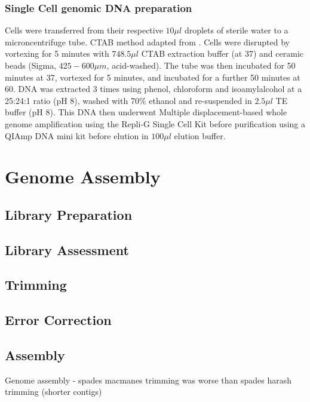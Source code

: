 \subsubsection{Single Cell genomic DNA preparation}
Cells were transferred from their respective \(10\mu l\) droplets of sterile water to a microncentrifuge tube.
CTAB method adapted from \citep{Winnepenninckx1993}.  Cells were disrupted by vortexing for 5 minutes with
\(748.5\mu l\) CTAB extraction buffer (at 37\celsius) and ceramic beads (Sigma, \(425-600\mu m\), acid-washed).
The tube was then incubated for 50 minutes at 37\celsius, vortexed for 5 minutes, and incubated for a further 50
minutes at 60\celsius. DNA was extracted 3 times using phenol, chloroform and isoamylalcohol at a 25:24:1 ratio (pH 8),
washed with 70\% ethanol and re-suspended in \(2.5\mu l\) TE buffer (pH 8). This DNA then underwent 
Multiple displacement-based whole genome amplification using the Repli-G Single Cell Kit before purification using a 
QIAmp DNA mini kit before elution in \(100\mu l\) elution buffer.



\section{Genome Assembly}


\subsection{Library Preparation}

\subsection{Library Assessment}

\subsection{Trimming}

\subsection{Error Correction}

\subsection{Assembly}


Genome assembly - spades macmanes trimming was worse than spades harash trimming (shorter contigs)







